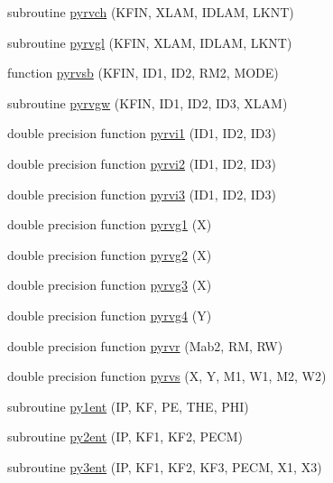 \begin{DoxyCompactItemize}
\item 
subroutine \hyperlink{pythia-6_84_824_8f_a7452e5c7a826962ce1c001af995ed6ef}{pyrvch} (K\+F\+IN, X\+L\+AM, I\+D\+L\+AM, L\+K\+NT)
\item 
subroutine \hyperlink{pythia-6_84_824_8f_a9cc390826ed9a3821e2295bf3cfa3ccd}{pyrvgl} (K\+F\+IN, X\+L\+AM, I\+D\+L\+AM, L\+K\+NT)
\item 
function \hyperlink{pythia-6_84_824_8f_abbd1ec6f2beaa101781110b202abb06f}{pyrvsb} (K\+F\+IN, I\+D1, I\+D2, R\+M2, M\+O\+DE)
\item 
subroutine \hyperlink{pythia-6_84_824_8f_a615871b7d284b85342c32545140f6435}{pyrvgw} (K\+F\+IN, I\+D1, I\+D2, I\+D3, X\+L\+AM)
\item 
double precision function \hyperlink{pythia-6_84_824_8f_a42b2d221de531f661ead0e1bef14807b}{pyrvi1} (I\+D1, I\+D2, I\+D3)
\item 
double precision function \hyperlink{pythia-6_84_824_8f_a9e6ea2faa5ba1af425bd3782c8069d02}{pyrvi2} (I\+D1, I\+D2, I\+D3)
\item 
double precision function \hyperlink{pythia-6_84_824_8f_a797da463f08ad3ff91ca5d428c5f5cc7}{pyrvi3} (I\+D1, I\+D2, I\+D3)
\item 
double precision function \hyperlink{pythia-6_84_824_8f_a2fc031269f435aa5547d90d480213f0d}{pyrvg1} (X)
\item 
double precision function \hyperlink{pythia-6_84_824_8f_a371f64ca765777a5a87c152e18482a4a}{pyrvg2} (X)
\item 
double precision function \hyperlink{pythia-6_84_824_8f_a23fb42dd91c099fbcd5cd2001c74e98d}{pyrvg3} (X)
\item 
double precision function \hyperlink{pythia-6_84_824_8f_a4de5cb4846e35b7378ff15e9a97710c4}{pyrvg4} (Y)
\item 
double precision function \hyperlink{pythia-6_84_824_8f_a5168f5ce45865125ee90d4a1967db80d}{pyrvr} (Mab2, RM, RW)
\item 
double precision function \hyperlink{pythia-6_84_824_8f_a78f4bff902221f0851a474a0642ca924}{pyrvs} (X, Y, M1, W1, M2, W2)
\item 
subroutine \hyperlink{pythia-6_84_824_8f_aa755c1ad09318a6b86ba9c501c7fcb3b}{py1ent} (IP, KF, PE, T\+HE, P\+HI)
\item 
subroutine \hyperlink{pythia-6_84_824_8f_a2b9b48d65354953ca74e6e3571daf5d4}{py2ent} (IP, K\+F1, K\+F2, P\+E\+CM)
\item 
subroutine \hyperlink{pythia-6_84_824_8f_a236783c5902cb61da4d1d5ce4491e2fe}{py3ent} (IP, K\+F1, K\+F2, K\+F3, P\+E\+CM, X1, X3)

\end{DoxyCompactItemize}
